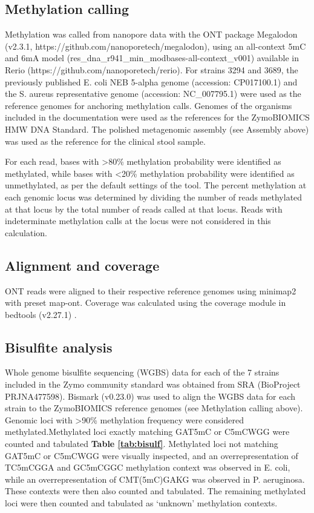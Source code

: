\subsection{Methylation calling}
\label{sec:methods}

Methylation was called from nanopore data with the ONT package Megalodon (v2.3.1, https://github.com/nanoporetech/megalodon), using an all-context 5mC and 6mA model (res\_dna\_r941\_min\_modbases-all-context\_v001) available in Rerio (https://github.com/nanoporetech/rerio). For strains 3294 and 3689, the previously published E. coli NEB 5-alpha genome (accession: CP017100.1) and the S. aureus representative genome (accession: NC\_007795.1) were used as the reference genomes for anchoring methylation calls. Genomes of the organisms included in the documentation were used as the references for the ZymoBIOMICS HMW DNA Standard. The polished metagenomic assembly (see Assembly above) was used as the reference for the clinical stool sample.

For each read, bases with >80\% methylation probability were identified as methylated, while bases with <20\% methylation probability were identified as unmethylated, as per the default settings of the tool. The percent methylation at each genomic locus was determined by dividing the number of reads methylated at that locus by the total number of reads called at that locus. Reads with indeterminate methylation calls at the locus were not considered in this calculation.

\subsection{Alignment and coverage}
\label{sec:methods}

ONT reads were aligned to their respective reference genomes using minimap2 with preset map-ont. Coverage was calculated using the coverage module in bedtools (v2.27.1) \citep{Quinlan2010-lu}.

\subsection{Bisulfite analysis}
\label{sec:methods}

Whole genome bisulfite sequencing (WGBS) data for each of the 7 strains included in the Zymo community standard was obtained from SRA (BioProject PRJNA477598). Bismark (v0.23.0) \citep{Krueger2011-cu} was used to align the WGBS data for each strain to the ZymoBIOMICS reference genomes (see Methylation calling above). Genomic loci with >90\% methylation frequency were considered methylated.Methylated loci exactly matching GAT5mC or C5mCWGG were counted and tabulated {\bf Table \ref{tab:bisulf}}. Methylated loci not matching GAT5mC or C5mCWGG were visually inspected, and an overrepresentation of TC5mCGGA and GC5mCGGC methylation context was observed in E. coli, while an overrepresentation of CMT(5mC)GAKG was observed in P. aeruginosa. These contexts were then also counted and tabulated. The remaining methylated loci were then counted and tabulated as ‘unknown’ methylation contexts.

